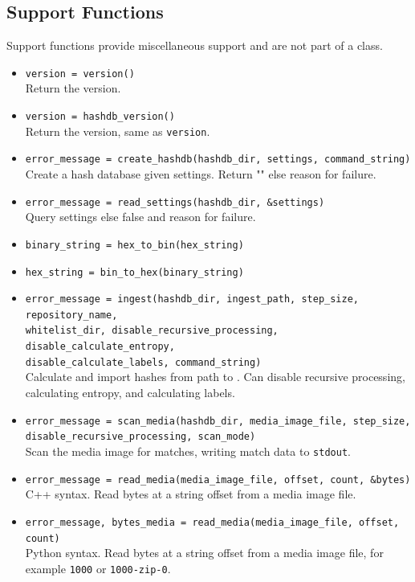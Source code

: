 \documentclass[11pt,fleqn]{article} %
\begin{document}
\subsection{Support Functions}
Support functions provide miscellaneous support and are not part of a class.
\begin{itemize}
\item \verb+version = version()+\\
Return the \hdb version.
\item \verb+version = hashdb_version()+\\
Return the \hdb version, same as \verb+version+.
\item \verb+error_message = create_hashdb(hashdb_dir, settings, command_string)+\\
Create a hash database given settings. Return "" else reason for failure.
\item \verb+error_message = read_settings(hashdb_dir, &settings)+\\
Query settings else false and reason for failure.
\item \verb+binary_string = hex_to_bin(hex_string)+
\item \verb+hex_string = bin_to_hex(binary_string)+
\item \verb+error_message = ingest(hashdb_dir, ingest_path, step_size, repository_name,+\\
\verb+whitelist_dir, disable_recursive_processing, disable_calculate_entropy,+\\
\verb+disable_calculate_labels, command_string)+\\
Calculate and import hashes from path to \hdb. Can disable recursive processing, calculating entropy, and calculating labels.
\item \verb+error_message = scan_media(hashdb_dir, media_image_file, step_size,+\\
\verb+disable_recursive_processing, scan_mode)+\\
Scan the media image for matches, writing match data to \verb+stdout+.
\item \verb+error_message = read_media(media_image_file, offset, count, &bytes)+\\
C++ syntax.  Read bytes at a string offset from a media image file.
\item \verb+error_message, bytes_media = read_media(media_image_file, offset, count)+\\
Python syntax. Read bytes at a string offset from a media image file, for example \verb+1000+ or \verb+1000-zip-0+.

\end{itemize}
\end{document}
